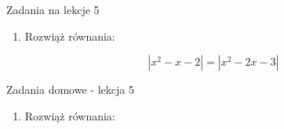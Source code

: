 \documentclass[12pt,a4paper]{article}
\begin{document}
	
	\begin{center}
		\LARGE Zadania na lekcje 5
	\end{center}
	\vspace{1.5cm}
	
	\begin{enumerate}[1.]
		\item Rozwiąż równania:

$$|x^2-x-2|=|x^2-2x-3|$$
		
	\end{enumerate}
	
	\newpage
	
	\begin{center}
		\LARGE Zadania domowe - lekcja 5
	\end{center}
	\vspace{1.5cm}
	
	\begin{enumerate}[1.]
		
		\item Rozwiąż równania: %
		

		
	\end{enumerate}
	
	
	
\end{document}
